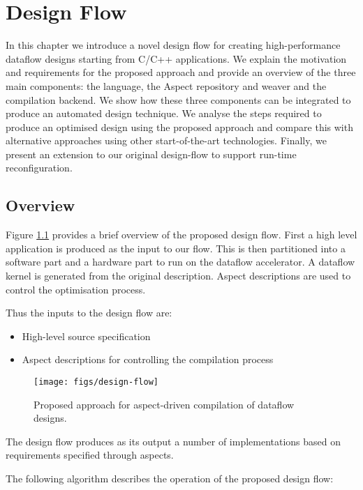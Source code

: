 \chapter{Design Flow}
\label{sec:design-flow}

In this chapter we introduce a novel design flow for creating
high-performance dataflow designs starting from C/C++ applications. We
explain the motivation and requirements for the proposed approach and
provide an overview of the three main components: the \FAST{}
language, the Aspect repository and weaver and the compilation
backend. We show how these three components can be integrated to
produce an automated design technique. We analyse the steps required
to produce an optimised design using the proposed approach and compare
this with alternative approaches using other start-of-the-art
technologies. Finally, we present an extension to our original
design-flow to support run-time reconfiguration.


\section{Overview}

Figure \ref{fig:design-flow-overview} provides a brief overview of the
proposed design flow. First a high level application is produced as
the input to our flow. This is then partitioned into a software part
and a hardware part to run on the dataflow accelerator. A dataflow
kernel is generated from the original description. Aspect descriptions
are used to control the optimisation process.

Thus the inputs to the design flow are:
\begin{itemize}
\item High-level source specification
\item Aspect descriptions for controlling the compilation process
\end{itemize}

\begin{figure}[!h]
  \texttt{[image: figs/design-flow]}
  \caption{Proposed approach for aspect-driven compilation of dataflow
    designs.}
  \label{fig:design-flow-overview}
\end{figure}

The design flow produces as its output a number of implementations based on
requirements specified through aspects.

The following algorithm describes the operation of the proposed design flow:

